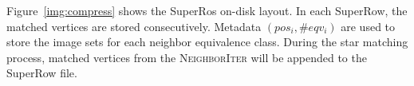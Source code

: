 Figure~\ref{img:compress} shows the SuperRos on-disk layout.
In each SuperRow, the matched vertices are stored consecutively.
Metadata $(pos_i, \#eqv_i)$ are used to store the image sets for each neighbor equivalence class.
During the star matching process, matched vertices from the \textsc{NeighborIter} will be appended to the SuperRow file.




